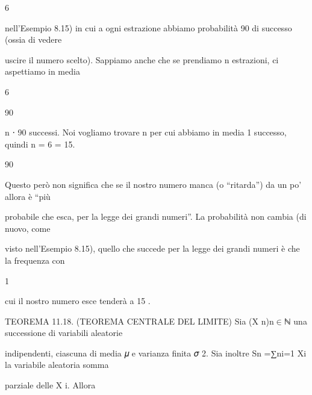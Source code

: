 \documentclass[a4paper,portrait,12pt]{article}
\begin{document}
6


\begin{flushleft}
nell'Esempio 8.15) in cui a ogni estrazione abbiamo probabilit\`{a} 90 di successo (ossia di vedere
\end{flushleft}


\begin{flushleft}
uscire il numero scelto). Sappiamo anche che se prendiamo n estrazioni, ci aspettiamo in media
\end{flushleft}


6


90


\begin{flushleft}
n ⋅ 90 successi. Noi vogliamo trovare n per cui abbiamo in media 1 successo, quindi n = 6 = 15.
\end{flushleft}


90





\begin{flushleft}
Questo per\`{o} non significa che se il nostro numero manca (o {``}ritarda'') da un po' allora \`{e} {``}più
\end{flushleft}


\begin{flushleft}
probabile che esca, per la legge dei grandi numeri''. La probabilit\`{a} non cambia (di nuovo, come
\end{flushleft}


\begin{flushleft}
visto nell'Esempio 8.15), quello che succede per la legge dei grandi numeri \`{e} che la frequenza con
\end{flushleft}


1


\begin{flushleft}
cui il nostro numero esce tender\`{a} a 15 .
\end{flushleft}


\begin{flushleft}
TEOREMA 11.18. (TEOREMA CENTRALE DEL LIMITE) Sia (X n)n$\in$ℕ una successione di variabili aleatorie
\end{flushleft}


\begin{flushleft}
indipendenti, ciascuna di media 𝜇 e varianza finita 𝜎 2. Sia inoltre Sn =∑ni=1 Xi la variabile aleatoria somma
\end{flushleft}


\begin{flushleft}
parziale delle X i. Allora
\end{flushleft}
\end{document}
